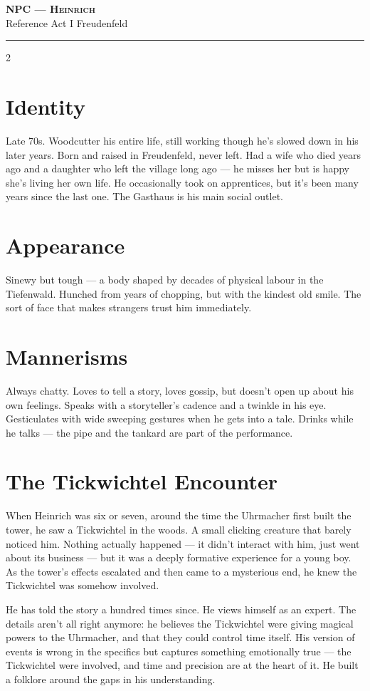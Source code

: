 \documentclass[10pt,letterpaper]{article}
\newcommand{\sceneheader}[4]{%
  \fancyhead[L]{\small\textcolor{accent}{\scshape #1}}%
  \fancyhead[R]{\small\textcolor{accent}{#2 \quad \textbullet \quad #3}}%
  \begin{center}
  {\LARGE\bfseries\scshape\textcolor{accent}{#1}}\\[2pt]
  {\small #2 \quad \textbullet \quad #3 \quad \textbullet \quad #4}\\[2pt]
  \textcolor{rulecol}{\rule{0.5\textwidth}{0.8pt}}
  \end{center}
  \vspace{-4pt}
}
\begin{document}
\label{sec:npc-heinrich}\sceneheader{NPC --- Heinrich}{Reference}{Act I}{Freudenfeld}

\begin{multicols}{2}

\section*{Identity}
Late 70s. Woodcutter his entire life, still working though he's slowed down in his later years. Born and raised in Freudenfeld, never left. Had a wife who died years ago and a daughter who left the village long ago --- he misses her but is happy she's living her own life. He occasionally took on apprentices, but it's been many years since the last one. The Gasthaus is his main social outlet.

\section*{Appearance}
Sinewy but tough --- a body shaped by decades of physical labour in the Tiefenwald. Hunched from years of chopping, but with the kindest old smile. The sort of face that makes strangers trust him immediately.

\section*{Mannerisms}
Always chatty. Loves to tell a story, loves gossip, but doesn't open up about his own feelings. Speaks with a storyteller's cadence and a twinkle in his eye. Gesticulates with wide sweeping gestures when he gets into a tale. Drinks while he talks --- the pipe and the tankard are part of the performance.

\section*{The Tickwichtel Encounter}
When Heinrich was six or seven, around the time the Uhrmacher first built the tower, he saw a Tickwichtel in the woods. A small clicking creature that barely noticed him. Nothing actually happened --- it didn't interact with him, just went about its business --- but it was a deeply formative experience for a young boy. As the tower's effects escalated and then came to a mysterious end, he knew the Tickwichtel was somehow involved.

He has told the story a hundred times since. He views himself as an expert. The details aren't all right anymore: he believes the Tickwichtel were giving magical powers to the Uhrmacher, and that they could control time itself. His version of events is wrong in the specifics but captures something emotionally true --- the Tickwichtel were involved, and time and precision are at the heart of it. He built a folklore around the gaps in his understanding.


\end{multicols}
\end{document}
